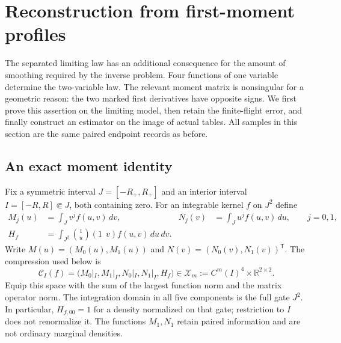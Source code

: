 \section{Reconstruction from first-moment profiles}
\label{sec:v74-moments}

The separated limiting law has an additional consequence for the amount
of smoothing required by the inverse problem.  Four functions of one
variable determine the two-variable law.  The relevant moment matrix is
nonsingular for a geometric reason: the two marked first derivatives
have opposite signs.  We first prove this assertion on the limiting
model, then retain the finite-flight error, and finally construct an
estimator on the image of actual tables.  All samples in this section
are the same paired endpoint records as before.

\subsection{An exact moment identity}

Fix a symmetric interval $J=[-R_+,R_+]$ and an interior interval
$I=[-R,R]\Subset J$, both containing zero.  For an integrable kernel
$f$ on $J^2$ define
\begin{align}
 M_j(u)&=\int_J v^j f(u,v)\,dv,&
 N_j(v)&=\int_J u^j f(u,v)\,du,\qquad j=0,1,
 \label{eq:v74-profiles}\\
 H_f&=\int_{J^2}\binom{1}{u}(1\ \ v)f(u,v)\,du\,dv.
 \label{eq:v74-matrix}
\end{align}
Write $M(u)=(M_0(u),M_1(u))$ and
$N(v)=(N_0(v),N_1(v))^{\mathsf T}$.  The compression used below is
\[
 \mathcal C_I(f)=\bigl(M_0|_I,M_1|_I,N_0|_I,N_1|_I,H_f\bigr)
 \in\mathcal X_m:=C^m(I)^4\times\mathbb R^{2\times2}.
\]
Equip this space with the sum of the largest function norm and the
matrix operator norm.  The integration domain in all five components
is the full gate $J^2$.  In particular, $H_{f,00}=1$ for a density
normalized on that gate; restriction to $I$ does not renormalize it.
The functions $M_1,N_1$ retain paired information and are not ordinary
marginal densities.

